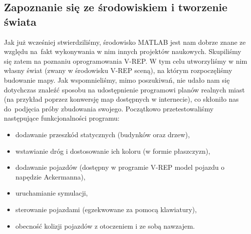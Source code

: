 \documentclass[11pt, a4paper, twoside]{report}
\begin{document}
\subsection{Zapoznanie się ze środowiskiem i tworzenie świata}
\label{subsec:scena}
Jak już wcześniej stwierdziliśmy, środowisko MATLAB jest nam dobrze znane ze względu na~fakt wykonywania w nim innych projektów naukowych. Skupiliśmy się zatem na poznaniu oprogramowania V-REP. W tym celu utworzyliśmy w nim własny świat (zwany w środowisku \mbox{V-REP} sceną), na którym rozpoczęliśmy budowanie mapy. Jak wspomnieliśmy, mimo poszukiwań, nie udało nam się dotychczas znaleźć sposobu na udostępnienie programowi planów realnych miast (na przykład poprzez konwersję map dostępnych w internecie), co skłoniło nas do~podjęcia próby zbudowania swojego. Początkowo przetestowaliśmy następujące funkcjonalności programu:
\begin{itemize}
	\item dodawanie przeszkód statycznych (budynków oraz drzew),
	\item wstawianie dróg i dostosowanie ich koloru (w formie płaszczyzn),
	\item dodawanie pojazdów (dostępny w programie V-REP model pojazdu o napędzie Ackermanna),
	\item uruchamianie symulacji,
	\item sterowanie pojazdami (egzekwowane za pomocą klawiatury),
	\item obecność kolizji pojazdów z otoczeniem i ze sobą nawzajem.
\end{itemize}
\end{document}

